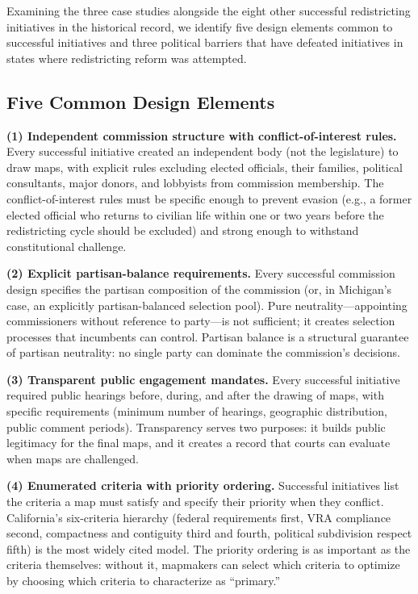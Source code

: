 Examining the three case studies alongside the eight other successful redistricting initiatives in the historical record, we identify five design elements common to successful initiatives and three political barriers that have defeated initiatives in states where redistricting reform was attempted.

\subsection{Five Common Design Elements}

\textbf{(1) Independent commission structure with conflict-of-interest rules.} Every successful initiative created an independent body (not the legislature) to draw maps, with explicit rules excluding elected officials, their families, political consultants, major donors, and lobbyists from commission membership. The conflict-of-interest rules must be specific enough to prevent evasion (e.g., a former elected official who returns to civilian life within one or two years before the redistricting cycle should be excluded) and strong enough to withstand constitutional challenge.

\textbf{(2) Explicit partisan-balance requirements.} Every successful commission design specifies the partisan composition of the commission (or, in Michigan's case, an explicitly partisan-balanced selection pool). Pure neutrality---appointing commissioners without reference to party---is not sufficient; it creates selection processes that incumbents can control. Partisan balance is a structural guarantee of partisan neutrality: no single party can dominate the commission's decisions.

\textbf{(3) Transparent public engagement mandates.} Every successful initiative required public hearings before, during, and after the drawing of maps, with specific requirements (minimum number of hearings, geographic distribution, public comment periods). Transparency serves two purposes: it builds public legitimacy for the final maps, and it creates a record that courts can evaluate when maps are challenged.

\textbf{(4) Enumerated criteria with priority ordering.} Successful initiatives list the criteria a map must satisfy and specify their priority when they conflict. California's six-criteria hierarchy (federal requirements first, VRA compliance second, compactness and contiguity third and fourth, political subdivision respect fifth) is the most widely cited model. The priority ordering is as important as the criteria themselves: without it, mapmakers can select which criteria to optimize by choosing which criteria to characterize as ``primary.''

